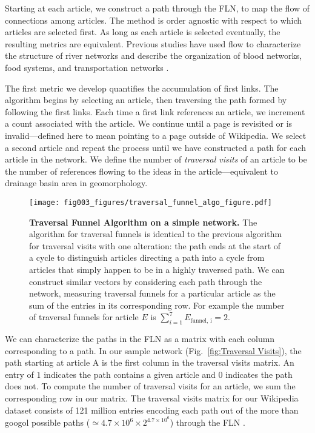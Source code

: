\documentclass[pre,twocolumn,twoside,superscriptaddress,floatfix]{revtex4-1}
\begin{document}
{Starting at each article, we construct a path through the FLN, 
to map the flow of connections among articles.
The method is order agnostic with respect to which articles are selected first. As long as each article is selected eventually, the resulting metrics are equivalent.
Previous studies have used flow to characterize the structure of river networks
\cite{horton1945erosional, dodds1999unified} and describe the organization of 
blood networks, food systems, and transportation networks
\cite{garlaschelli2003universal}.

The first metric we develop quantifies the accumulation of first links.
The algorithm begins by selecting an article, then traversing the path formed
by following the first links. Each time a first link references an article, we increment a count
associated with the article. 
We continue until a page is revisited or is invalid---defined here to mean pointing to a page outside of Wikipedia.
We select a second article and repeat the process until we have 
constructed a path for each article in the network. 
We define the number of {\it traversal visits} of an article 
to be the number of references flowing to the ideas in the article---equivalent
to drainage basin area in geomorphology. 

\begin{figure}[tp!]
  \texttt{[image: fig003\_figures/traversal\_funnel\_algo\_figure.pdf]}
  \caption{
    \textbf{Traversal Funnel Algorithm on a simple network.}
  The algorithm for traversal funnels is identical to the previous algorithm for traversal visits with one alteration: the path ends at the start of a cycle to distinguish articles directing a path into a cycle from articles that simply happen to be in a highly traversed path. We can construct similar vectors by considering each path through the network, measuring traversal funnels for a particular article as the sum of the entries in its corresponding row. For example
  the number of traversal funnels for article $E$ is 
  $\sum_{i=1}^7 E_{\text{funnel, i}} = 2$.}
  \label{fig:Traversal Funnels}

\end{figure}

We can characterize the paths in the FLN as a matrix with each column corresponding to a path. In our sample network 
(Fig.~\ref{fig:Traversal Visits}), the path starting at article A is the 
first column in the traversal visits matrix. 
An entry of $1$ indicates the path contains a given article and 
$0$ indicates the path does not.
To compute the number of traversal visits for an article, we sum the corresponding row in our matrix.
The traversal visits matrix for 
our Wikipedia dataset consists of 121 million entries encoding each path out of the more than 
googol possible paths ($\simeq4.7\times10^6\times2^{4.7\times10^6}$) through the FLN .

}
\end{document}

